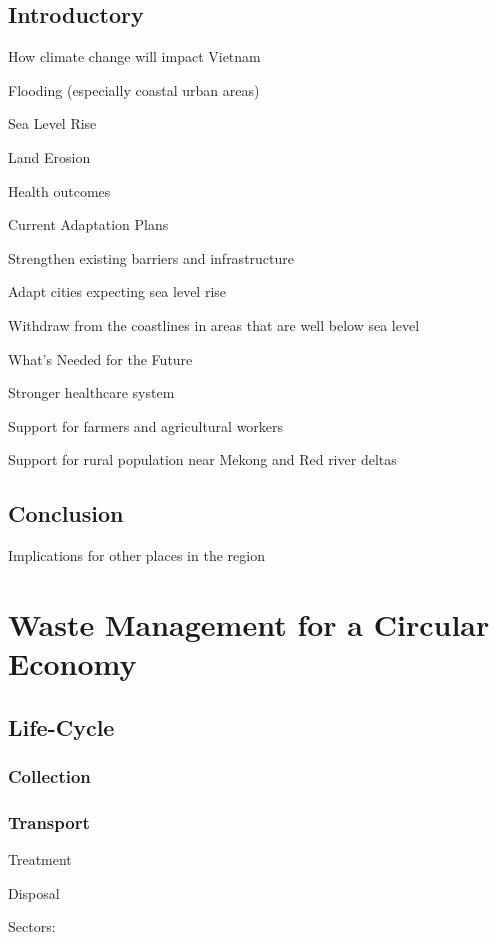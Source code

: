 \documentclass{book}\usepackage{knitr}
\begin{document}
\section{Introductory}

How climate change will impact Vietnam

Flooding (especially coastal urban areas)

Sea Level Rise

Land Erosion

Health outcomes

Current Adaptation Plans

Strengthen existing barriers and infrastructure

Adapt cities expecting sea level rise

Withdraw from the coastlines in areas that are well below sea level

What's Needed for the Future

Stronger healthcare system

Support for farmers and agricultural workers

Support for rural population near Mekong and Red river deltas

\section{Conclusion}

Implications for other places in the region


\chapter{Waste Management for a Circular Economy}

\section{Life-Cycle}

\subsection{Collection}

\subsection{Transport}

Treatment

Disposal

Sectors:
\end{document}
